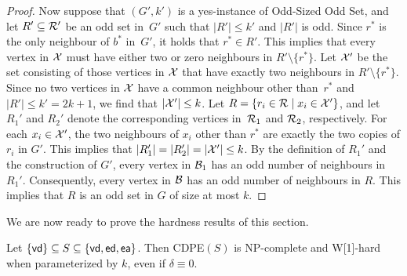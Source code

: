 \documentclass[11pt]{llncs}
\newcommand{\vd}{{\sf vd}}
\newcommand{\ed}{{\sf ed}}
\newcommand{\ea}{{\sf ea}}
\newcommand{\cdpe}{{\sc CDPE}}
\newcommand{\NP}{{\sf NP}}
\newcommand{\W}{{\sf W[1]}}
\begin{document}
\begin{proof}
Now suppose that $(G',k')$ is a yes-instance of {\sc Odd-Sized Odd Set}, and
let $R'\subseteq {\cal R}'$ be an odd set in~$G'$ such that $|R'|\leq k'$ and
$|R'|$ is odd. Since $r^*$ is the only neighbour of $b^*$ in~$G'$, it holds
that $r^*\in R'$. This implies that every vertex in ${\cal X}$ must have either
two or zero neighbours in $R'\setminus \{r^*\}$. Let ${\cal X}'$ be the set
consisting of those vertices in ${\cal X}$ that have exactly two neighbours in
$R'\setminus \{r^*\}$. Since no two vertices in ${\cal X}$ have a common
neighbour other than~$r^*$ and $|R'|\leq k'=2k+1$, we find that $|{\cal
X}'|\leq k$. Let $R=\{r_i \in {\cal R} \mid x_i\in {\cal X}'\}$, and let~$R_1'$
and $R_2'$ denote the corresponding vertices in~${\cal R}_1$ and ${\cal R}_2$,
respectively. For each $x_i\in {\cal X}'$, the two neighbours of $x_i$ other
than $r^*$ are exactly the two copies of $r_i$ in $G'$. This implies that
$|R_1'|=|R_2'|=|{\cal X}'|\leq k$. By the definition of $R_1'$ and the
construction of $G'$, every vertex in ${\cal B}_1$ has an odd number of
neighbours in $R_1'$. Consequently, every vertex in ${\cal B}$ has an odd
number of neighbours in $R$. This implies that $R$ is an odd set in $G$ of size
at most $k$.
\end{proof}
We are now ready to prove the hardness results of this section.

\begin{sloppypar}
\begin{theorem}\label{thm:vertex-undir}
Let $\{\vd\} \subseteq  S\subseteq \{\vd,\ed,\ea\}$. Then \cdpe$(S)$ is
\NP-complete and \W-hard when parameterized by $k$, even if
$\delta\equiv 0$.
\end{theorem}
\end{sloppypar}
\end{document}
